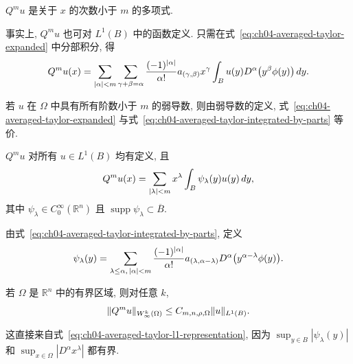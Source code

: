 \setcounter{thmcount}{8}
\begin{Proposition}
\label{prop:ch04-averaged-taylor-degree}
$Q^m u$ 是关于 $x$ 的次数小于 $m$ 的多项式.
\end{Proposition}

事实上, $Q^m u$ 也可对 $L^1(B)$ 中的函数定义. 只需在式~\eqref{eq:ch04-averaged-taylor-expanded} 中分部积分, 得
\begin{equation}
\MathBookFormulaID{formula-ch04-averaged-taylor-integrated-by-parts}
\label{eq:ch04-averaged-taylor-integrated-by-parts}
Q^m u(x)=\sum_{|\alpha|<m}\sum_{\gamma+\beta=\alpha}
\frac{(-1)^{|\alpha|}}{\alpha!}a_{(\gamma,\beta)}x^\gamma
\int_Bu(y)D^\alpha\bigl(y^\beta\phi(y)\bigr)\,dy.
\end{equation}

\setcounter{thmcount}{10}
\begin{Remark}
\label{rem:ch04-weak-derivative-equivalence}
若 $u$ 在 $\Omega$ 中具有所有阶数小于 $m$ 的弱导数, 则由弱导数的定义, 式~\eqref{eq:ch04-averaged-taylor-expanded} 与式~\eqref{eq:ch04-averaged-taylor-integrated-by-parts} 等价.
\end{Remark}

\begin{Proposition}
\label{prop:ch04-averaged-taylor-l1-definition}
$Q^m u$ 对所有 $u\in L^1(B)$ 均有定义, 且
\begin{equation}
\MathBookFormulaID{formula-ch04-averaged-taylor-l1-representation}
\label{eq:ch04-averaged-taylor-l1-representation}
Q^m u(x)=\sum_{|\lambda|<m}x^\lambda\int_B\psi_\lambda(y)u(y)\,dy,
\end{equation}
其中 $\psi_\lambda\in C_0^\infty(\mathbb R^n)$ 且 $\operatorname{supp}\psi_\lambda\subset\overline B$.
\end{Proposition}
\begin{Proof}
由式~\eqref{eq:ch04-averaged-taylor-integrated-by-parts}, 定义
\begin{equation}
\MathBookFormulaID{formula-ch04-psi-lambda-definition}
\label{eq:ch04-psi-lambda-definition}
\psi_\lambda(y)=\sum_{\lambda\leq\alpha,\,|\alpha|<m}
\frac{(-1)^{|\alpha|}}{\alpha!}a_{(\lambda,\alpha-\lambda)}
D^\alpha\bigl(y^{\alpha-\lambda}\phi(y)\bigr).
\end{equation}
\end{Proof}

\setcounter{thmcount}{14}
\begin{Corollary}
\label{cor:ch04-averaged-taylor-linfty-bound}
若 $\Omega$ 是 $\mathbb R^n$ 中的有界区域, 则对任意 $k$,
\begin{equation}
\MathBookFormulaID{formula-ch04-averaged-taylor-linfty-bound}
\label{eq:ch04-averaged-taylor-linfty-bound}
\|Q^m u\|_{W_\infty^k(\Omega)}
\leq C_{m,n,\rho,\Omega}\|u\|_{L^1(B)}.
\end{equation}
\end{Corollary}
\begin{Proof}
这直接来自式~\eqref{eq:ch04-averaged-taylor-l1-representation}, 因为 $\sup_{y\in B}|\psi_\lambda(y)|$ 和 $\sup_{x\in\Omega}|D^\alpha x^\lambda|$ 都有界.
\end{Proof}

